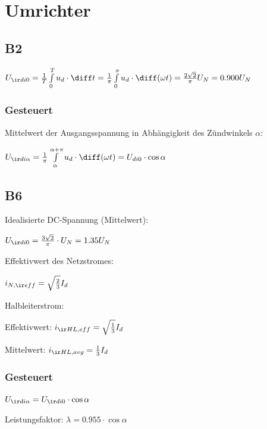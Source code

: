 \documentclass[fs, german]{latex4ei_fs}
\begin{document}
 \section{Umrichter}

 \begin{sectionbox}
 \subsection{B2}
$U_{\ir di0} = \frac{1}{T} \int \limits_0^T u_d \cdot \diff t = \frac{1}{\pi} \int \limits_0^\pi u_d \cdot \diff (\omega t) = \frac{2 \sqrt 2}{\pi} U_N = 0.900 U_N$
 
\subsubsection{Gesteuert}
Mittelwert der Ausgangsspannung in Abhängigkeit des Zündwinkels $\alpha$:

$U_{\ir di \alpha} = \frac{1}{\pi} \int \limits_\alpha^{\alpha + \pi} u_d \cdot \diff (\omega t) = U_{di 0} \cdot \cos \alpha$ 
 \subsection{B6}
 Idealisierte DC-Spannung (Mittelwert): 

$U_{\ir di0} = \frac{3 \sqrt 2}{\pi} \cdot U_N = 1.35 U_N$

Effektivwert des Netzstromes:

$i_{N, \ir eff} = \sqrt{\frac{2}{3}} I_d $

Halbleiterstrom:

Effektivwert: $i_{\ir HL, eff} = \sqrt{\frac{1}{3}} I_d$

Mittelwert: $i_{\ir HL,  avg} = \frac{1}{3} I_d$

\subsubsection{Gesteuert}

$U_{\ir di \alpha} = U_{\ir di0} \cdot \cos \alpha$

Leistungsfaktor: $\lambda = 0.955 \cdot \cos \alpha$
 \end{sectionbox}
\end{document}
